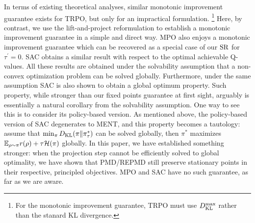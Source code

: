In terms of existing theoretical analyses, 
similar monotonic improvement guarantee exists for TRPO, but only for an
impractical formulation.%
%
\footnote{
	For the monotonic improvement guarantee,
	TRPO must use $D_{\mathrm{KL}}^{\max} $ rather than the stanard KL divergence.
} 
Here, by contrast,
we use the lift-and-project reformulation to establish a monotonic
improvement guarantee in a simple and direct way.
MPO also enjoys a monotonic
improvement guarantee which can be recovered as a special case of our $\text{SR}$ for $\tau^\prime = 0$.
SAC obtains a similar result with respect to the optimal achievable
Q-values.
All these results are obtained under the solvability assumption that a non-convex optimization problem can be solved globally.
Furthermore, under the same assumption SAC is also shown to obtain a global optimum property. 
Such property, while stronger than our fixed points guarantee at first sight, arguably is essentially a natural corollary from the solvability assumption.
One way to see this is to consider its policy-based version.
As mentioned above, the policy-based version of SAC degenerates to MENT,
and this property becomes a tautology: assume that $\min_\pi D_{\mathrm{KL}}(\pi \| \pi^*_\tau)$ can be solved globally, then $\pi^*$ maximizes $\mathbb{E}_{\rho \sim \pi} r(\rho) + \tau \mathcal{H}(\pi)$  globally.
In this paper, we have established something stronger:
when the projection step cannot be efficiently solved to global optimality,
we have shown that PMD/REPMD still preserve stationary points in 
their respective, principled objectives.
MPO and SAC have no such guarantee, as far as we are aware. 

